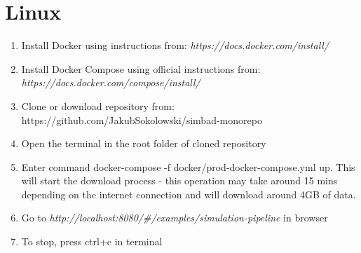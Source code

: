 \section{Linux}
\begin{enumerate}
    \item Install Docker using instructions from: \newline
    \textit{https://docs.docker.com/install/}
    \item Install Docker Compose using official instructions from: \newline
    \textit{https://docs.docker.com/compose/install/}
    \item Clone or download repository from: \newline
     https://github.com/JakubSokolowski/simbad-monorepo
    \item Open the terminal in the root folder of cloned repository
    \item Enter command docker-compose -f docker/prod-docker-compose.yml up. This will start the download process - this operation may take around 15 mins depending on the internet connection and will download around 4GB of data.
    \item Go to \textit{http://localhost:8080/\#/examples/simulation-pipeline } in browser
    \item To stop, press ctrl+c in terminal
\end{enumerate}